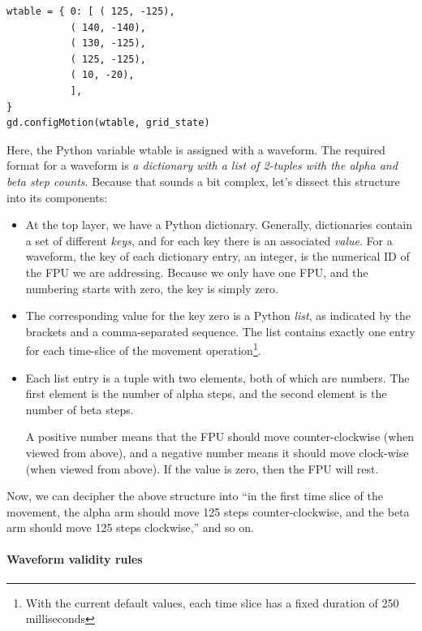 \documentclass[11pt,a4paper]{report}
\begin{document}
\begin{verbatim}
wtable = { 0: [ ( 125, -125),
           ( 140, -140),
           ( 130, -125),
           ( 125, -125),
           ( 10, -20),
           ],
}
gd.configMotion(wtable, grid_state)
\end{verbatim}

Here, the Python variable wtable is assigned with
a waveform. The required format for a waveform
is \emph{a dictionary with a list of 2-tuples
  with the alpha and beta step counts}. Because
that sounds a bit complex, let's dissect this
structure into its components:

\begin{itemize}
  
\item At the top layer, we have a Python dictionary. Generally,
  dictionaries contain a set of different \emph{keys}, and for each
  key there is an associated \emph{value}. For a waveform, the key of
  each dictionary entry, an integer, is the numerical ID of the FPU we
  are addressing.  Because we only have one FPU, and the numbering
  starts with zero, the key is simply zero.

\item The corresponding value for the key zero is a Python
  \emph{list}, as indicated by the brackets and a comma-separated
  sequence. The list contains exactly one entry for each time-slice of
  the movement operation\footnote{With the current default values,
    each time slice has a fixed duration of 250 milliseconds}.

\item Each list entry is a tuple with two elements, both of which are
  numbers. The first element is the number of alpha steps, and the
  second element is the number of beta steps.

  A positive number means that the FPU should move counter-clockwise
  (when viewed from above), and a negative number means it should move
  clock-wise (when viewed from above). If the value is zero, then the
  FPU will rest.

\end{itemize}

Now, we can decipher the above structure into ``in the first time
slice of the movement, the alpha arm should move 125 steps
counter-clockwise, and the beta arm should move 125 steps
clockwise,'' and so on.

\paragraph{Waveform validity rules}
\end{document}
